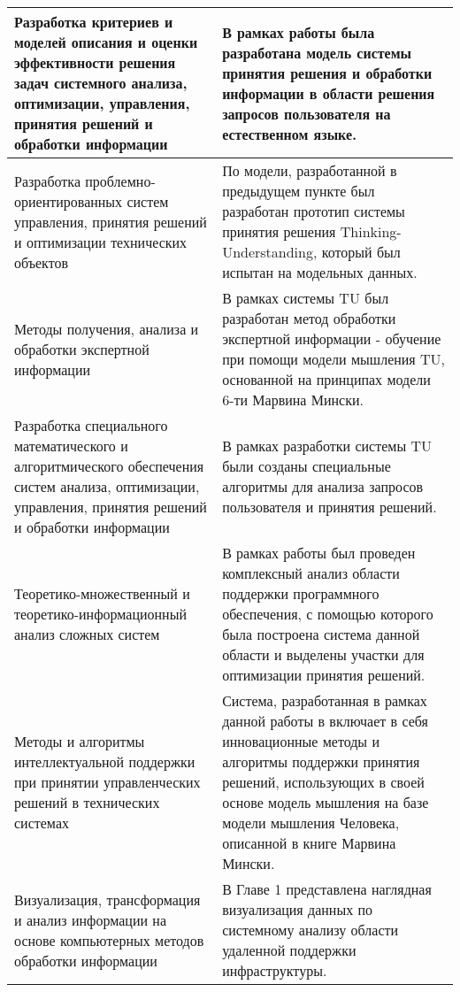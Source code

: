 \begin{longtable}{|p{7cm}|p{9cm}|}
\hline \hline
\endlastfoot
\hline
   Разработка критериев и моделей описания и оценки эффективности решения задач системного анализа, оптимизации, управления, принятия решений и обработки информации & В рамках работы была разработана модель системы принятия решения и обработки информации в области решения запросов пользователя на естественном языке. \\
   \hline
   Разработка проблемно-ориентированных систем управления, принятия решений и оптимизации технических объектов & По модели, разработанной в предыдущем пункте был разработан прототип системы принятия решения Thinking-Understanding, который был испытан на модельных данных.\\
   \hline
   Методы получения, анализа и обработки экспертной информации & В рамках системы TU был разработан метод обработки экспертной информации - обучение при помощи модели мышления TU, основанной на принципах модели 6-ти Марвина Мински. \\
   \hline
   Разработка специального математического и алгоритмического обеспечения систем анализа, оптимизации, управления, принятия решений и обработки информации & В рамках разработки системы TU были созданы специальные алгоритмы для анализа запросов пользователя и принятия решений.\\
  \hline 
  Теоретико-множественный и теоретико-информационный анализ сложных систем & В рамках работы был проведен комплексный анализ области поддержки программного обеспечения, с помощью которого была построена система данной области и выделены участки для оптимизации принятия решений.\\
  \hline
  Методы и алгоритмы интеллектуальной поддержки при принятии управленческих решений в технических системах & Система, разработанная в рамках данной работы в включает в себя инновационные методы и алгоритмы поддержки принятия решений, использующих в своей основе модель мышления на базе модели мышления Человека, описанной в книге Марвина Мински. \\ 
  \hline
  Визуализация, трансформация и анализ информации на основе компьютерных методов обработки информации & В Главе 1 представлена наглядная визуализация данных по системному анализу области удаленной поддержки инфраструктуры. \\
  \hline	
\end{longtable}


